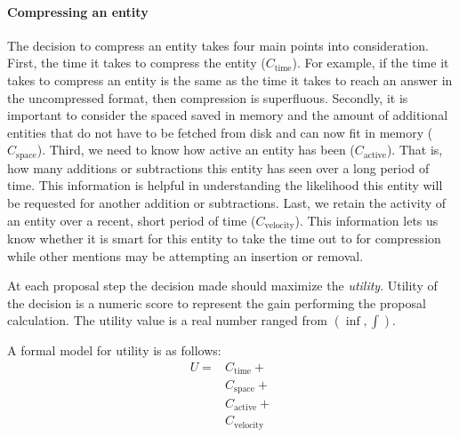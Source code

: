 \paragraph{Compressing an entity} The decision to compress an entity takes
four main points into consideration. First, the time it takes to compress
the entity ($ C_\text{time}$).
For example, if the time it takes to compress an entity is the same as the time it takes to
reach an answer in the uncompressed format, then compression is superfluous.
Secondly, it is important to consider the spaced saved in memory and the amount of 
additional entities that do not have to be fetched from disk and can now fit in memory ($C_\text{space}$).
Third, we need to know how active an entity has been ($C_\text{active}$).
That is, how many additions or subtractions this entity has seen over a long period of time.
This information is helpful in understanding the likelihood this entity will be requested
for another addition or subtractions.
Last, we retain the activity of an entity over a recent, short period of time ($C_\text{velocity}$). This information lets us know whether it is smart for this entity to take the time out to
for compression while other mentions may be attempting an insertion or removal.

  At each proposal step the decision made should maximize the \textit{utility}.
  Utility of the decision is a numeric score to represent the gain performing
  the proposal calculation. The utility value is a real number ranged from $( \inf, \int)$.


  A formal model for utility is as follows:
  \begin{equation}
    \begin{array}{ll}
  U = & C_\text{time} +\\ 
      & C_\text{space} +\\
      & C_\text{active} +\\ %
      & C_\text{velocity} %
      \end{array}
  \end{equation}





